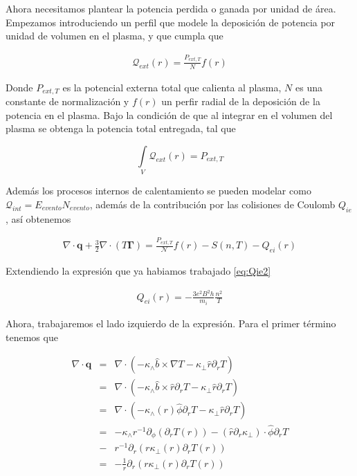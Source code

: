 Ahora necesitamos plantear la potencia perdida o ganada por unidad de \'area. Empezamos introduciendo un perfil que modele la deposici\'on de potencia por unidad de volumen en el plasma, y que cumpla que 

\begin{eqnarray*}
  \mathcal{Q}_{ext}(r) = \frac{P_{ext,T}}{N}f(r)
\end{eqnarray*}

Donde $P_{ext,T}$ es la potencial externa total que calienta al plasma, $N$ es una constante de normalizaci\'on y $f(r)$ un perfir radial de la deposici\'on de la potencia en el plasma. Bajo la condici\'on de que al integrar en el volumen del plasma se obtenga la potencia total entregada, tal que 
 
\begin{equation*}
  \int\limits_V \mathcal{Q}_{ext}(r) = P_{ext,T}
\end{equation*}

Además los procesos internos de calentamiento se pueden modelar como $\mathcal{Q}_{int} = E_{evento}N_{evento}$, además de la contribuci\'on por las colisiones de Coulomb $Q_{ie}$, as\'i obtenemos

\begin{eqnarray}
  \nabla\cdot\textbf{q} + \frac{3}{2}\nabla\cdot(T\pmb{\Gamma}) = \frac{P_{ext,T}}{\mathcal{N}}f(r) -  S(n,T) - Q_{ei}(r)
\end{eqnarray}

Extendiendo la expresi\'on que ya habiamos trabajado \eqref{eq:Qie2}

\begin{eqnarray}\label{eq:kappa}
  Q_{ei}(r) = -\frac{3e^2B^2h}{m_i} \frac{n^2}{T}
\end{eqnarray}

Ahora, trabajaremos el lado izquierdo de la expresi\'on. Para el primer t\'ermino tenemos que

\begin{eqnarray}
  \nabla\cdot\textbf{q} &=& \nabla\cdot(-\kappa_\wedge\hat{b}\times\nabla T - \kappa_\perp\hat{r}\partial_r T) \nonumber\\
                        &=& \nabla\cdot(-\kappa_\wedge\hat{b}\times\hat{r}\partial_r T - \kappa_\perp\hat{r}\partial_r T) \nonumber \\
                        &=& \nabla\cdot(-\kappa_\wedge(r)\hat{\phi}\partial_r T - \kappa_\perp\hat{r}\partial_r T) \nonumber\\
                        &=& -\kappa_\wedge r^{-1} \partial_\phi (\partial_r T(r)) - (\hat{r} \partial_r \kappa_\perp)\cdot \hat{\phi}\partial_r T \nonumber\\ 
                        &-& r^{-1}\partial_r(r \kappa_\perp (r) \partial_r T(r)) \nonumber\\
                        &=& - \frac{1}{r}\partial_r(r \kappa_\perp (r) \partial_r T(r))
\end{eqnarray}

